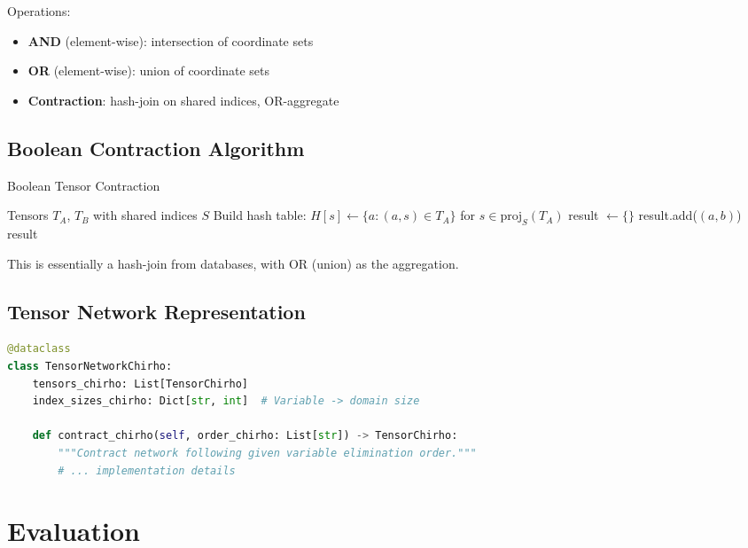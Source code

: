 \documentclass[11pt,a4paper]{article}
\begin{document}
Operations:
\begin{itemize}
  \item \textbf{AND} (element-wise): intersection of coordinate sets
  \item \textbf{OR} (element-wise): union of coordinate sets
  \item \textbf{Contraction}: hash-join on shared indices, OR-aggregate
\end{itemize}

\subsection{Boolean Contraction Algorithm}

\begin{algorithm}[ht]
\caption{Boolean Tensor Contraction}
\label{alg:contract_chirho}
\begin{algorithmic}[1]
\Require Tensors $T_A$, $T_B$ with shared indices $S$
\State Build hash table: $H[s] \gets \{a : (a, s) \in T_A\}$ for $s \in \text{proj}_S(T_A)$
\State result $\gets \{\}$
    \State result.add($(a, b)$)  
  \EndFor
\EndFor
\State \Return result
\end{algorithmic}
\end{algorithm}

This is essentially a hash-join from databases, with OR (union) as the aggregation.

\subsection{Tensor Network Representation}

\begin{lstlisting}[language=Python]
@dataclass
class TensorNetworkChirho:
    tensors_chirho: List[TensorChirho]
    index_sizes_chirho: Dict[str, int]  # Variable -> domain size

    def contract_chirho(self, order_chirho: List[str]) -> TensorChirho:
        """Contract network following given variable elimination order."""
        # ... implementation details
\end{lstlisting}

\section{Evaluation}
\label{sec:evaluation_chirho}
\end{document}
